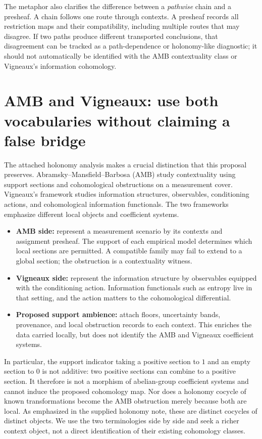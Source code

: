 \documentclass[11pt]{article}
\begin{document}
The metaphor also clarifies the difference between a \emph{pathwise} chain and a presheaf. A chain follows one route through contexts. A presheaf records all restriction maps and their compatibility, including multiple routes that may disagree. If two paths produce different transported conclusions, that disagreement can be tracked as a path-dependence or holonomy-like diagnostic; it should not automatically be identified with the AMB contextuality class or Vigneaux's information cohomology.

\section{AMB and Vigneaux: use both vocabularies without claiming a false bridge}

The attached holonomy analysis makes a crucial distinction that this proposal preserves. Abramsky--Mansfield--Barbosa (AMB) study contextuality using support sections and cohomological obstructions on a measurement cover. Vigneaux's framework studies information structures, observables, conditioning actions, and cohomological information functionals. The two frameworks emphasize different local objects and coefficient systems.

\begin{itemize}[leftmargin=2em]
  \item \textbf{AMB side:} represent a measurement scenario by its contexts and assignment presheaf. The support of each empirical model determines which local sections are permitted. A compatible family may fail to extend to a global section; the obstruction is a contextuality witness.
  \item \textbf{Vigneaux side:} represent the information structure by observables equipped with the conditioning action. Information functionals such as entropy live in that setting, and the action matters to the cohomological differential.
  \item \textbf{Proposed support ambience:} attach floors, uncertainty bands, provenance, and local obstruction records to each context. This enriches the data carried locally, but does not identify the AMB and Vigneaux coefficient systems.
\end{itemize}

In particular, the support indicator taking a positive section to $1$ and an empty section to $0$ is not additive: two positive sections can combine to a positive section. It therefore is not a morphism of abelian-group coefficient systems and cannot induce the proposed cohomology map. Nor does a holonomy cocycle of known transformations become the AMB obstruction merely because both are local. As emphasized in the supplied holonomy note, these are distinct cocycles of distinct objects. We use the two terminologies side by side and seek a richer context object, not a direct identification of their existing cohomology classes.
\end{document}
